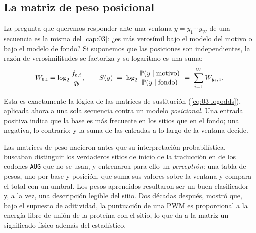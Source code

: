 \subsection{La matriz de peso posicional}

La pregunta que queremos responder ante una ventana $y=y_1\cdots y_W$ de una secuencia es la misma del \cref{cap:03}: ¿es más verosímil bajo el modelo del motivo o bajo el modelo de fondo? Si suponemos que las posiciones son independientes, la razón de verosimilitudes se factoriza y su logaritmo es una suma:
\begin{equation}\label{eq:04-pwm}
W_{b,i} = \log_2\frac{f_{b,i}}{q_b},\qquad
S(y) \;=\; \log_2\frac{\mathbb{P}(y\mid\text{motivo})}{\mathbb{P}(y\mid\text{fondo})} \;=\; \sum_{i=1}^{W} W_{y_i,\,i}.
\end{equation}

\begin{simbolos}
\end{simbolos}

Esta es exactamente la lógica de las matrices de sustitución (\cref{eq:03-logodds}), aplicada ahora a una sola secuencia contra un modelo \emph{posicional}. Una entrada positiva indica que la base es más frecuente en los sitios que en el fondo; una negativa, lo contrario; y la suma de las entradas a lo largo de la ventana decide.

\begin{historia}
Las matrices de peso nacieron antes que su interpretación probabilística. \textcite{c04-stormo1982} buscaban distinguir los verdaderos sitios de inicio de la traducción en  de los codones \texttt{AUG} que no se usan, y entrenaron para ello un \emph{perceptrón}: una tabla de pesos, uno por base y posición, que suma sus valores sobre la ventana y compara el total con un umbral. Los pesos aprendidos resultaron ser un buen clasificador y, a la vez, una descripción legible del sitio. Dos décadas después, \textcite{c04-stormo2000} mostró que, bajo el supuesto de aditividad, la puntuación de una PWM es proporcional a la energía libre de unión de la proteína con el sitio, lo que da a la matriz un significado físico además del estadístico.
\end{historia}

